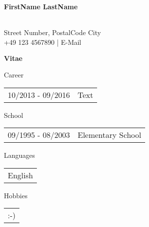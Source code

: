 \begin{minipage}{.3\textwidth}
	\begin{flushleft}
		\color{lightblue}\small\textbf{FirstName LastName}\\
		~
	\end{flushleft}
\end{minipage}
\hfill
\begin{minipage}{.7\textwidth}
	\begin{flushright}
		\small\color{lightblue}Street Number, PostalCode City\\
		+49 123 4567890 | E-Mail
	\end{flushright}
\end{minipage}

{\large\textbf{Vitae}}

Career

\begin{table}[H]
	\begin{tabular}{!{\color{lightgray}\vrule} p{4cm} l}
		10/2013 - 09/2016 & Text\\
	\end{tabular}
\end{table}

School

\begin{table}[H]
	\begin{tabular}{!{\color{lightgray}\vrule} p{4cm} l}
		09/1995 - 08/2003 & Elementary School\\
	\end{tabular}
\end{table}

Languages

\begin{table}[H]
	\begin{tabular}{!{\color{lightgray}\vrule} l}
		English\\
	\end{tabular}
\end{table}

Hobbies

\begin{table}[H]
	\begin{tabular}{!{\color{lightgray}\vrule} l}
		:-)
	\end{tabular}
\end{table}